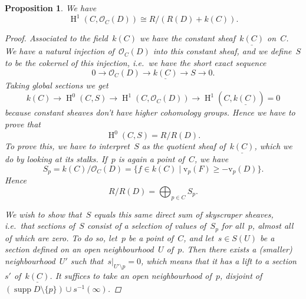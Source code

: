 \documentclass[10pt,a4paper]{article}
\theoremstyle{lecture}
\newtheorem{proposition}[theorem]{Proposition}
\DeclareMathOperator\HH{H}
\DeclareMathOperator\supp{supp}
\begin{document}
\begin{proposition}
  \label{proposition:HH1}
  We have
  \begin{equation}
    \HH^1(C,\mathcal{O}_C(D))\cong R/(R(D)+k(C)).
  \end{equation}

  \begin{proof}
    Associated to the field~$k(C)$ we have the constant sheaf~$\underline{k(C)}$ on~$C$. We have a natural injection of~$\mathcal{O}_C(D)$ into this constant sheaf, and we define~$S$ to be the cokernel of this injection, i.e.\ we have the short exact sequence
    \begin{equation}
      0\to\mathcal{O}_C(D)\to\underline{k(C)}\to S\to 0.
    \end{equation}
    Taking global sections we get
    \begin{equation}
      k(C)\to\HH^0(C,S)\to\HH^1(C,\mathcal{O}_C(D))\to\HH^1(C,\underline{k(C)})=0
    \end{equation}
    because constant sheaves don't have higher cohomology groups. Hence we have to prove that
    \begin{equation}
      \HH^0(C,S)=R/R(D).
    \end{equation}
    To prove this, we have to interpret~$S$ as the quotient sheaf of~$\underline{k(C)}$, which we do by looking at its stalks. If~$p$ is again a point of~$C$, we have
    \begin{equation}
      S_p=k(C)/\mathcal{O}_C(D)=\{f\in k(C)\mid \mathrm{v}_p(F)\geq -\mathrm{v}_p(D)\}.
    \end{equation}
    Hence
    \begin{equation}
      R/R(D)=\bigoplus_{p\in C}S_p.
    \end{equation}

    We wish to show that~$S$ equals this same direct sum of skyscraper sheaves, i.e.\ that sections of~$S$ consist of a selection of values of~$S_p$ for all~$p$, almost all of which are zero. To do so, let~$p$ be a point of~$C$, and let~$s\in S(U)$ be a section defined on an open neighbourhood~$U$ of~$p$. Then there exists a (smaller) neighbourhood~$U'$ such that~$s|_{U'\setminus p}=0$, which means that it has a lift to a section~$s'$ of~$\underline{k(C)}$. It suffices to take an open neighbourhood of~$p$, disjoint of~$(\supp D\setminus\{p\})\cup s^{-1}(\infty)$.
  \end{proof}
\end{proposition}
\end{document}
